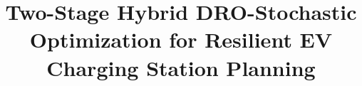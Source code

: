 \documentclass[journal]{IEEEtran}
\providecommand{\1}{\mathbf{1}}
\begin{document}
\title{Two-Stage Hybrid DRO-Stochastic  Optimization  for Resilient EV Charging Station Planning}



% 

\renewcommand{\IEEEmembership}[1]{\textit{#1}}
\end{document}
